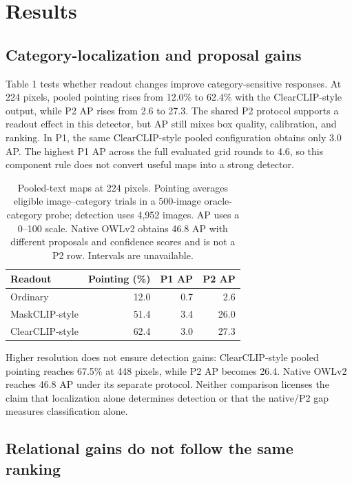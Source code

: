 \documentclass[10pt,twocolumn,letterpaper]{article}
\begin{document}
\section{Results}\label{results}

\subsection{Category-localization and proposal
gains}\label{category-localization-and-proposal-gains}

Table 1 tests whether readout changes improve category-sensitive
responses. At 224 pixels, pooled pointing rises from 12.0\% to 62.4\%
with the ClearCLIP-style output, while P2 AP rises from 2.6 to 27.3. The
shared P2 protocol supports a readout effect in this detector, but AP
still mixes box quality, calibration, and ranking. In P1, the same
ClearCLIP-style pooled configuration obtains only 3.0 AP. The highest P1
AP across the full evaluated grid rounds to 4.6, so this component rule
does not convert useful maps into a strong detector.

\begin{table}[tb]
\centering
\caption{Pooled-text maps at 224 pixels. Pointing averages eligible
image--category trials in a 500-image oracle-category probe; detection
uses 4,952 images. AP uses a 0--100 scale. Native OWLv2 obtains 46.8 AP
with different proposals and confidence scores and is not a P2 row.
Intervals are unavailable.}
\label{tab:1}
\begin{tabular}{@{}lrrr@{}}
\toprule
Readout & Pointing (\%) & P1 AP & P2 AP \\
\midrule
Ordinary & 12.0 & 0.7 & 2.6 \\
MaskCLIP-style & 51.4 & 3.4 & 26.0 \\
ClearCLIP-style & 62.4 & 3.0 & 27.3 \\
\bottomrule
\end{tabular}
\end{table}

Higher resolution does not ensure detection gains: ClearCLIP-style
pooled pointing reaches 67.5\% at 448 pixels, while P2 AP becomes 26.4.
Native OWLv2 reaches 46.8 AP under its separate protocol. Neither
comparison licenses the claim that localization alone determines
detection or that the native/P2 gap measures classification alone.

\subsection{Relational gains do not follow the same
ranking}\label{relational-gains-do-not-follow-the-same-ranking}
\end{document}
